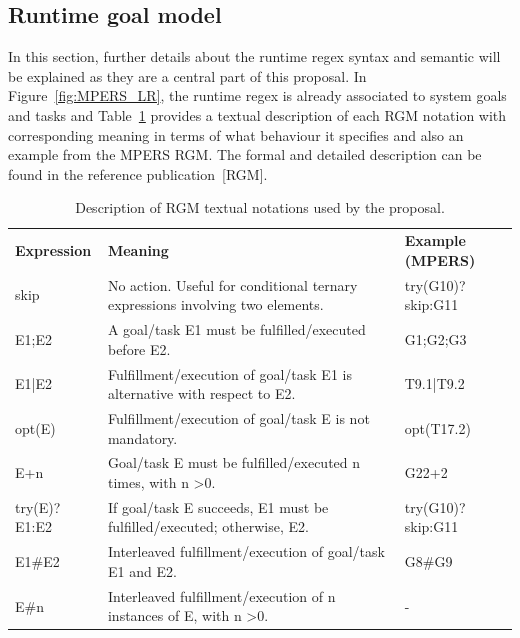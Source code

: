 \subsection{Runtime goal model}

In this section, further details about the runtime regex syntax and semantic will be explained as they are a central part of this proposal. In Figure~\ref{fig:MPERS_LR}, the runtime regex is already associated to system goals and tasks and Table~\ref{tab:RGM_REGEX} provides a textual description of each RGM notation with corresponding meaning in terms of what behaviour it specifies and also an example from the MPERS RGM. The formal and detailed description can be found in the reference publication~[RGM].

\begin{table}[h]\label{tab:RGM_REGEX}
{\renewcommand{\arraystretch}{1.5}
\begin{tabularx}{\textwidth}{@{}l|X|X@{}}
\toprule
\textbf{Expression} & \textbf{Meaning}                                                                   & \textbf{Example (MPERS)} \\ 
skip                & No action. Useful for conditional ternary expressions involving two elements.      & try(G10)?skip:G11        \\ 
E1;E2               & A goal/task E1 must be fulfilled/executed before E2.                               & G1;G2;G3                 \\ 
E1|E2               & Fulfillment/execution of goal/task E1 is alternative with respect to E2. & T9.1|T9.2                \\ 
opt(E)              & Fulfillment/execution of goal/task E is not mandatory.                             & opt(T17.2)               \\ 
E+n                 & Goal/task E must be fulfilled/executed n times, with n \textgreater 0.             & G22+2                    \\ 
try(E)?E1:E2        & If goal/task E succeeds, E1 must be fulfilled/executed; otherwise, E2.             & try(G10)?skip:G11        \\ 
E1\#E2              & Interleaved fulfillment/execution of goal/task E1 and E2.                          & G8\#G9                   \\ 
E\#n                & Interleaved fulfillment/execution of n instances of E, with n \textgreater 0.      & -                        \\ \bottomrule
\end{tabularx}
}
\caption{Description of RGM textual notations used by the proposal.}
\end{table}

